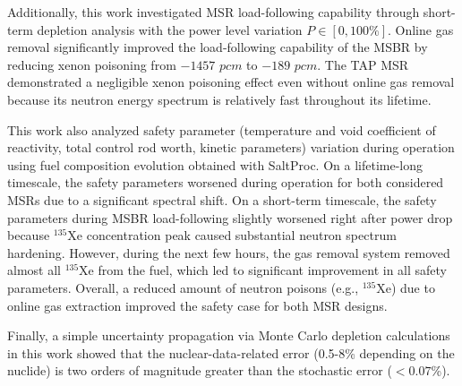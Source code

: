Additionally, this work investigated \gls{MSR} load-following capability 
through short-term depletion analysis with the power level variation 
$P\in[0,100\%]$. Online gas removal significantly improved the load-following 
capability of the \gls{MSBR} by reducing xenon poisoning from $-1457$ $pcm$ to 
$-189$ $pcm$. The \gls{TAP} \gls{MSR} demonstrated a negligible 
xenon poisoning effect even without online gas removal because its neutron 
energy spectrum is relatively fast throughout its lifetime.

This work also analyzed safety parameter (temperature and void coefficient of 
reactivity, total control rod worth, kinetic parameters) variation during 
operation using fuel composition evolution obtained with SaltProc. On a 
lifetime-long timescale, the safety parameters worsened during operation for 
both considered \glspl{MSR} due to a significant spectral shift. On a 
short-term timescale, the safety parameters during \gls{MSBR} 
load-following slightly worsened right after power drop because $^{135}$Xe 
concentration peak caused substantial neutron spectrum hardening. However, 
during the next few hours, the gas removal system removed almost all 
$^{135}$Xe from the fuel, which led to significant improvement in all safety 
parameters. Overall, a reduced amount of neutron poisons (e.g., $^{135}$Xe) 
due to online gas extraction improved the safety case for both \gls{MSR} 
designs.

Finally, a simple uncertainty propagation via Monte Carlo depletion 
calculations in this work showed that the nuclear-data-related error (0.5-8\% 
depending on the nuclide) is two orders of magnitude greater than the 
stochastic error ($<0.07$\%).